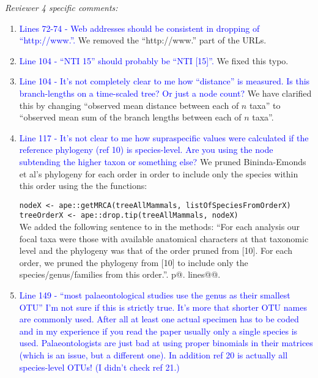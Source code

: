 \documentclass[12pt,letterpaper]{article}
\renewcommand{\subsection}[1]{%
\bigskip
\begin{center}
\begin{large}
\normalfont\itshape #1
\end{large}
\end{center}}
\begin{document}
\subsection{Reviewer 4 specific comments:}
\begin{enumerate}
\item{\textcolor{blue}{Lines 72-74 - Web addresses should be consistent in dropping of ``http://www.''.}}
We removed the ``http://www.'' part of the URLs.

\item{\textcolor{blue}{Line 104 - ``NTI 15'' should probably be ``NTI [15]''.}}
We fixed this typo.

\item{\textcolor{blue}{Line 104 - It's not completely clear to me how ``distance'' is measured. Is this branch-lengths on a time-scaled tree? Or just a node count?}}
We have clarified this by changing ``observed mean distance between each of $n$ taxa'' to ``observed mean sum of the branch lengths between each of $n$ taxa''.

\item{\textcolor{blue}{Line 117 - It's not clear to me how supraspecific values were calculated if the reference phylogeny (ref 10) is species-level. Are you using the node subtending the higher taxon or something else?}}
We pruned Bininda-Emonds et al's phylogeny for each order in order to include only the species within this order using the the functions:

\texttt{nodeX <- ape::getMRCA(treeAllMammals, listOfSpeciesFromOrderX)}\\
\texttt{treeOrderX <- ape::drop.tip(treeAllMammals, nodeX)}\\

We added the following sentence to in the methods:
``For each analysis our focal taxa were those with available anatomical characters at that taxonomic level and the phylogeny was that of the order pruned from [10]. For each order, we pruned the phylogeny from [10] to include only the species/genus/families from this order.''. p@. lines@@.


\item{\textcolor{blue}{Line 149 - ``most palaeontological studies use the genus as their smallest OTU'' I'm not sure if this is strictly true. It's more that shorter OTU names are commonly used. After all at least one actual specimen has to be coded and in my experience if you read the paper usually only a single species is used. Palaeontologists are just bad at using proper binomials in their matrices (which is an issue, but a different one). In addition ref 20 is actually all species-level OTUs! (I didn't check ref 21.)}}


\end{enumerate}
\end{document}
